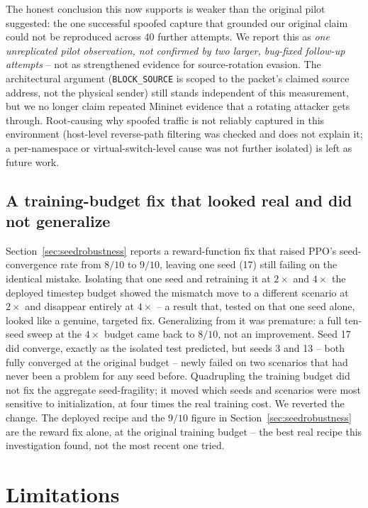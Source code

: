 \documentclass[conference]{IEEEtran}
\begin{document}
The honest conclusion this now supports is weaker than the original pilot suggested: the one
successful spoofed capture that grounded our original claim could not be reproduced across 40
further attempts. We report this as \emph{one unreplicated pilot observation, not confirmed by two
larger, bug-fixed follow-up attempts} -- not as strengthened evidence for source-rotation evasion.
The architectural argument (\texttt{BLOCK\_SOURCE} is scoped to the packet's claimed source
address, not the physical sender) still stands independent of this measurement, but we no longer
claim repeated Mininet evidence that a rotating attacker gets through. Root-causing why spoofed
traffic is not reliably captured in this environment (host-level reverse-path filtering was
checked and does not explain it; a per-namespace or virtual-switch-level cause was not further
isolated) is left as future work.

\subsection{A training-budget fix that looked real and did not generalize}
\label{sec:budgetcorrection}

Section~\ref{sec:seedrobustness} reports a reward-function fix that raised PPO's seed-convergence
rate from $8/10$ to $9/10$, leaving one seed (17) still failing on the identical mistake. Isolating
that one seed and retraining it at $2\times$ and $4\times$ the deployed timestep budget showed the
mismatch move to a different scenario at $2\times$ and disappear entirely at $4\times$ -- a result
that, tested on that one seed alone, looked like a genuine, targeted fix. Generalizing from it was
premature: a full ten-seed sweep at the $4\times$ budget came back to $8/10$, not an improvement.
Seed 17 did converge, exactly as the isolated test predicted, but seeds 3 and 13 -- both fully
converged at the original budget -- newly failed on two scenarios that had never been a problem for
any seed before. Quadrupling the training budget did not fix the aggregate seed-fragility; it moved
which seeds and scenarios were most sensitive to initialization, at four times the real training
cost. We reverted the change. The deployed recipe and the $9/10$ figure in
Section~\ref{sec:seedrobustness} are the reward fix alone, at the original training budget -- the
best real recipe this investigation found, not the most recent one tried.

\section{Limitations}
\end{document}
